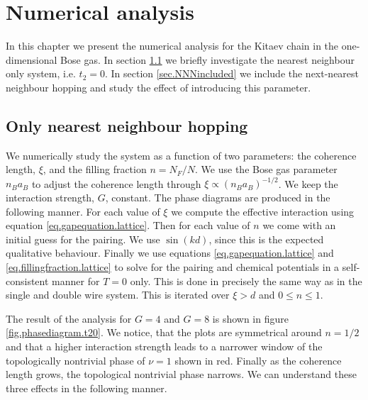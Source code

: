 
\chapter{Numerical analysis} %

\label{Chapter13} %

In this chapter we present the numerical analysis for the Kitaev chain in the one-dimensional Bose gas. In section \ref{sec.onlyNN} we briefly investigate the nearest neighbour only system, i.e. $t_2 = 0$. In section \ref{sec.NNNincluded} we include the next-nearest neighbour hopping and study the effect of introducing this parameter. 
 
\section{Only nearest neighbour hopping} \label{sec.onlyNN}
We numerically study the system as a function of two parameters: the coherence length, $\xi$, and the filling fraction $n = N_F/N$. We use the Bose gas parameter $n_Ba_B$ to adjust the coherence length through $\xi \propto (n_Ba_B)^{-1/2}$. We keep the interaction strength, $G$, constant. The phase diagrams are produced in the following manner. For each value of $\xi$ we compute the effective interaction using equation \eqref{eq.gapequation.lattice}. Then for each value of $n$ we come with an initial guess for the pairing. We use $\sin(kd)$, since this is the expected qualitative behaviour. Finally we use equations \eqref{eq.gapequation.lattice} and \eqref{eq.fillingfraction.lattice} to solve for the pairing and chemical potentials in a self-consistent manner for $T = 0$ only. This is done in precisely the same way as in the single and double wire system. This is iterated over $\xi > d$ and $0\leq n \leq 1$. 

The result of the analysis for $G = 4$ and $G = 8$ is shown in figure \ref{fig.phasediagram.t20}. We notice, that the plots are symmetrical around $n = 1/2$ and that a higher interaction strength leads to a narrower window of the topologically nontrivial phase of $\nu = 1$ shown in red. Finally as the coherence length grows, the topological nontrivial phase narrows. We can understand these three effects in the following manner. 

